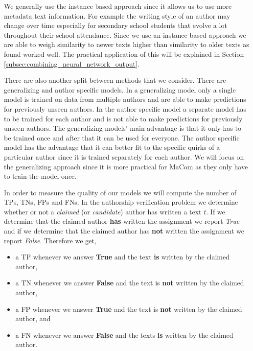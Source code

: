 We generally use the instance based approach since it allows us to use more
metadata text information. For example the writing style of an author may change
over time especially for secondary school students that evolve a lot throughout
their school attendance. Since we use an instance based approach we are able
to weigh similarity to newer texts higher than similarity to older texts as
\citet{hansen2014} found worked well. The practical application of this will be
explained in Section \ref{subsec:combining_neural_network_output}.

There are also another split between methods that we consider. There are
generalizing and author specific models. In a generalizing model only a single
model is trained on data from multiple authors and are able to make predictions
for previously unseen authors. In the author specific model a separate model has
to be trained for each author and is not able to make predictions for previously
unseen authors. The generalizing models' main advantage is that it only has to
be trained once and after that it can be used for everyone. The author specific
model has the advantage that it can better fit to the specific quirks of a
particular author since it is trained separately for each author. We will focus
on the generalizing approach since it is more practical for MaCom as they only
have to train the model once.

In order to measure the quality of our models we will compute the number
of \glspl{TP}, \glspl{TN}, \glspl{FP} and \glspl{FN}. In the authorship
verification problem we determine whether or not a \textit{claimed} (or
\textit{candidate}) author has written a text $t$. If we determine that the
claimed author \textbf{has} written the assignment we report \textit{True} and
if we determine that the claimed author has \textbf{not} written the assignment
we report \textit{False}. Therefore we get,

\begin{itemize}
    \item a \gls{TP} whenever we answer \textbf{True} and the text \textbf{is}
        written by the claimed author,
    \item a \gls{TN} whenever we answer \textbf{False} and the text is
        \textbf{not} written by the claimed author,
    \item a \gls{FP} whenever we answer \textbf{True} and the text is
        \textbf{not} written by the claimed author, and
    \item a \gls{FN} whenever we answer \textbf{False} and the texts \textbf{is}
        written by the claimed author.
\end{itemize}

